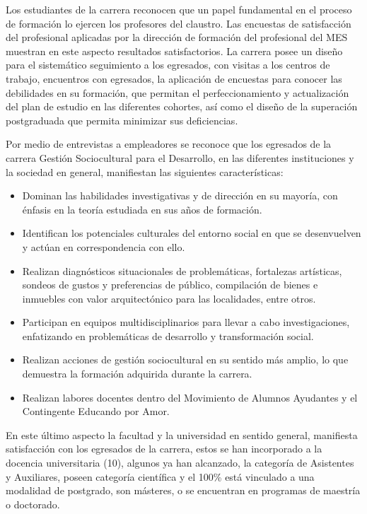 Los estudiantes de la carrera reconocen que un papel fundamental en el proceso de formación lo ejercen los profesores del claustro. Las encuestas de satisfacción del profesional aplicadas por la dirección de formación del profesional del MES muestran en este aspecto resultados satisfactorios. La carrera posee un diseño para el sistemático seguimiento a los egresados, con visitas a los centros de trabajo, encuentros con egresados, la aplicación de encuestas para conocer las debilidades en su formación, que permitan el perfeccionamiento y actualización del plan de estudio en las diferentes cohortes, así como el diseño de la superación postgraduada que permita minimizar sus deficiencias. 

Por medio de entrevistas a empleadores se reconoce que los egresados de la carrera Gestión Sociocultural para el Desarrollo, en las diferentes instituciones y la sociedad en general, manifiestan las siguientes características: 

\begin{itemize}
	\setlength\itemsep{-0.5em}
	\item Dominan las habilidades investigativas y de dirección en su mayoría, con énfasis en la teoría estudiada en sus años de formación.
	\item Identifican los potenciales culturales del entorno social en que se desenvuelven y actúan en correspondencia con ello.
	\item Realizan diagnósticos situacionales de problemáticas, fortalezas artísticas, sondeos de gustos y preferencias de público, compilación de bienes e inmuebles con valor arquitectónico para las localidades, entre otros.
	\item Participan en equipos multidisciplinarios para llevar a cabo investigaciones, enfatizando en problemáticas de desarrollo y transformación social.
	\item Realizan acciones de gestión sociocultural en su sentido más amplio, lo que demuestra la formación adquirida durante la carrera.
	\item Realizan labores docentes dentro del Movimiento de Alumnos Ayudantes y el Contingente Educando por Amor.
\end{itemize}

En este último aspecto la facultad y la universidad en sentido general, manifiesta satisfacción con los egresados de la carrera, estos se han incorporado a la docencia universitaria (10), algunos ya han alcanzado, la categoría de Asistentes y Auxiliares, poseen categoría científica y el 100\% está vinculado a una modalidad de postgrado, son másteres, o se encuentran en programas de maestría o doctorado.

